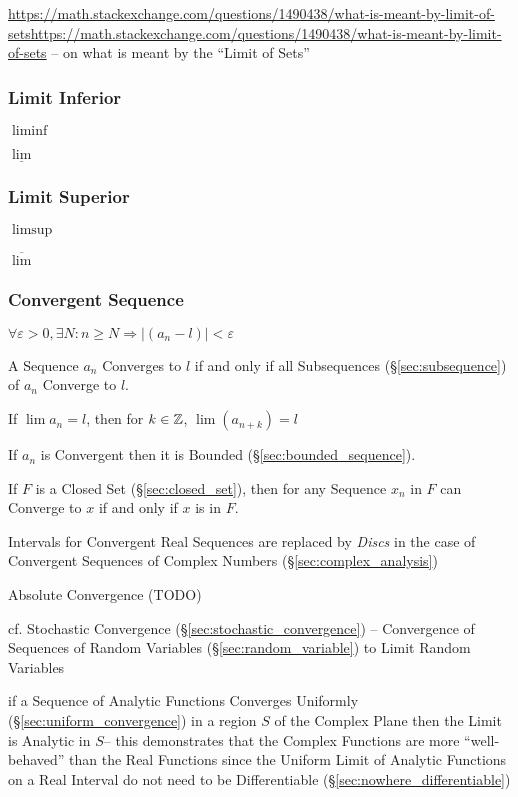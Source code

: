 \url{https://math.stackexchange.com/questions/1490438/what-is-meant-by-limit-of-setshttps://math.stackexchange.com/questions/1490438/what-is-meant-by-limit-of-sets}
-- on what is meant by the ``Limit of Sets''



\subsubsection{Limit Inferior}\label{sec:liminf}

$\liminf$

$\underline{\lim}$



\subsubsection{Limit Superior}\label{sec:limsup}

$\limsup$

$\overline{\lim}$



\subsubsection{Convergent Sequence}\label{sec:convergent_sequence}

$\forall \varepsilon > 0, \exists N : n \geq N \Rightarrow |(a_n - l)| <
\varepsilon$

A Sequence $a_n$ Converges to $l$ if and only if all Subsequences
(\S\ref{sec:subsequence}) of $a_n$ Converge to $l$.

If $\lim a_n = l$, then for $k \in \mathbb{Z}$, $\lim (a_{n+k}) = l$

If $a_n$ is Convergent then it is Bounded
(\S\ref{sec:bounded_sequence}).

If $F$ is a Closed Set (\S\ref{sec:closed_set}), then for any Sequence
$x_n$ in $F$ can Converge to $x$ if and only if $x$ is in $F$.

Intervals for Convergent Real Sequences are replaced by \emph{Discs} in the
case of Convergent Sequences of Complex Numbers (\S\ref{sec:complex_analysis})

Absolute Convergence (TODO)

\fist cf. Stochastic Convergence (\S\ref{sec:stochastic_convergence}) --
Convergence of Sequences of Random Variables (\S\ref{sec:random_variable}) to
Limit Random Variables

if a Sequence of Analytic Functions Converges Uniformly
(\S\ref{sec:uniform_convergence}) in a region $S$ of the Complex Plane then the
Limit is Analytic in $S$-- this demonstrates that the Complex Functions are
more ``well-behaved'' than the Real Functions since the Uniform Limit of
Analytic Functions on a Real Interval do not need to be Differentiable
(\S\ref{sec:nowhere_differentiable})

